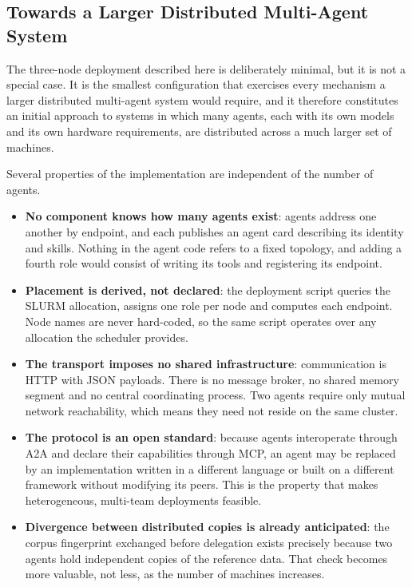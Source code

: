 \subsection{Towards a Larger Distributed Multi-Agent System}
\label{subsec:mas-scaling}

The three-node deployment described here is deliberately minimal, but it is not a special
case. It is the smallest configuration that exercises every mechanism a larger distributed
multi-agent system would require, and it therefore constitutes an initial approach to
systems in which many agents, each with its own models and its own hardware requirements,
are distributed across a much larger set of machines.

Several properties of the implementation are independent of the number of agents.

\begin{itemize}
    \item \textbf{No component knows how many agents exist}: agents address one another by
    endpoint, and each publishes an agent card describing its identity and skills. Nothing
    in the agent code refers to a fixed topology, and adding a fourth role would consist of
    writing its tools and registering its endpoint.

    \item \textbf{Placement is derived, not declared}: the deployment script queries the
    SLURM allocation, assigns one role per node and computes each endpoint. Node names are
    never hard-coded, so the same script operates over any allocation the scheduler
    provides.

    \item \textbf{The transport imposes no shared infrastructure}: communication is HTTP
    with JSON payloads. There is no message broker, no shared memory segment and no central
    coordinating process. Two agents require only mutual network reachability, which means
    they need not reside on the same cluster.

    \item \textbf{The protocol is an open standard}: because agents interoperate through
    A2A and declare their capabilities through MCP, an agent may be replaced by an
    implementation written in a different language or built on a different framework
    without modifying its peers. This is the property that makes heterogeneous, multi-team
    deployments feasible.

    \item \textbf{Divergence between distributed copies is already anticipated}: the corpus
    fingerprint exchanged before delegation exists precisely because two agents hold
    independent copies of the reference data. That check becomes more valuable, not less,
    as the number of machines increases.
\end{itemize}

